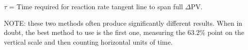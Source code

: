 \documentclass[12pt,a4paper]{article}
\begin{document}
\vskip 10pt

$\tau$ = Time required for reaction rate tangent line to span full $\Delta$PV.

\vskip 10pt

NOTE: these two methods often produce significantly different results.  When in doubt, the best method to use is the first one, measuring the 63.2\% point on the vertical scale and then counting horizontal units of time.


\vfil \eject 
\end{document}

